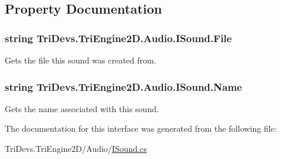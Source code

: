 \subsection{Property Documentation}
\hypertarget{interface_tri_devs_1_1_tri_engine2_d_1_1_audio_1_1_i_sound_af308fcad8f9f11a39af7a3d253039cae}{
\subsubsection[{File}]{\setlength{\rightskip}{0pt plus 5cm}string Tri\-Devs.\-Tri\-Engine2\-D.\-Audio.\-I\-Sound.\-File\hspace{0.3cm}{\ttfamily [get]}}}\label{interface_tri_devs_1_1_tri_engine2_d_1_1_audio_1_1_i_sound_af308fcad8f9f11a39af7a3d253039cae}


Gets the file this sound was created from. 

\hypertarget{interface_tri_devs_1_1_tri_engine2_d_1_1_audio_1_1_i_sound_a2307573aedd92969cf3d051b395c5bc0}{
\subsubsection[{Name}]{\setlength{\rightskip}{0pt plus 5cm}string Tri\-Devs.\-Tri\-Engine2\-D.\-Audio.\-I\-Sound.\-Name\hspace{0.3cm}{\ttfamily [get]}}}\label{interface_tri_devs_1_1_tri_engine2_d_1_1_audio_1_1_i_sound_a2307573aedd92969cf3d051b395c5bc0}


Gets the name associated with this sound. 



The documentation for this interface was generated from the following file\-:\begin{DoxyCompactItemize}
\item 
Tri\-Devs.\-Tri\-Engine2\-D/\-Audio/\hyperlink{_i_sound_8cs}{I\-Sound.\-cs}\end{DoxyCompactItemize}
